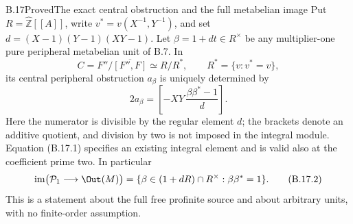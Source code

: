 \begin{statement}{B.17}{Proved}{The exact central obstruction and the full metabelian image}
Put $R=\widehat{\mathbb Z}[[A]]$, write $v^*=v(X^{-1},Y^{-1})$,
and set $d=(X-1)(Y-1)(XY-1)$.
Let $\beta=1+dt\in R^\times$ be any multiplier-one pure
peripheral metabelian unit of B.7. In
\[
 C=F''/\overline{[F'',F]}\simeq R/R^*,
 \qquad R^*=\{v:v^*=v\},
\]
its central peripheral obstruction $a_\beta$ is uniquely determined by
\[
             2a_\beta=
       \left[-XY\,\frac{\beta\beta^*-1}{d}\right].
 \tag{B.17.1}
\]
Here the numerator is divisible by the regular element $d$;
the brackets denote an additive quotient, and division by two is
not imposed in the integral module. Equation (B.17.1) specifies
an existing integral element and is valid also at the coefficient
prime two. In particular
\[
 \operatorname{im}\bigl(\mathcal P_1\longrightarrow\Out(M)\bigr)
   =\{\beta\in(1+dR)\cap R^\times:\beta\beta^*=1\}.
 \tag{B.17.2}
\]
This is a statement about the full free profinite source and about
arbitrary units, with no finite-order assumption.
\end{statement}
